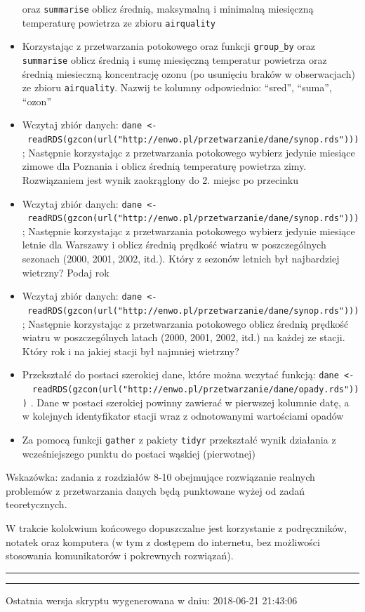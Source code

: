 \documentclass[]{book}
\theoremstyle{definition}
\theoremstyle{definition}
\theoremstyle{definition}
\theoremstyle{remark}
\begin{document}
\begin{itemize}
  oraz \texttt{summarise} oblicz średnią, maksymalną i minimalną
  miesięczną temperaturę powietrza ze zbioru \texttt{airquality}
\item
  Korzystając z przetwarzania potokowego oraz funkcji \texttt{group\_by}
  oraz \texttt{summarise} oblicz średnią i sumę miesięczną temperatur
  powietrza oraz średnią miesieczną koncentrację ozonu (po usunięciu
  braków w obserwacjach) ze zbioru \texttt{airquality}. Nazwij te
  kolumny odpowiednio: ``sred'', ``suma'', ``ozon''
\item
  Wczytaj zbiór danych:
  \texttt{dane\ \textless{}-\ readRDS(gzcon(url("http://enwo.pl/przetwarzanie/dane/synop.rds")))}
  ; Następnie korzystając z przetwarzania potokowego wybierz jedynie
  miesiące zimowe dla Poznania i oblicz średnią temperaturę powietrza
  zimy. Rozwiązaniem jest wynik zaokrąglony do 2. miejsc po przecinku
\item
  Wczytaj zbiór danych:
  \texttt{dane\ \textless{}-\ readRDS(gzcon(url("http://enwo.pl/przetwarzanie/dane/synop.rds")))}
  ; Następnie korzystając z przetwarzania potokowego wybierz jedynie
  miesiące letnie dla Warszawy i oblicz średnią prędkość wiatru w
  poszczególnych sezonach (2000, 2001, 2002, itd.). Który z sezonów
  letnich był najbardziej wietrzny? Podaj rok
\item
  Wczytaj zbiór danych:
  \texttt{dane\ \textless{}-\ readRDS(gzcon(url("http://enwo.pl/przetwarzanie/dane/synop.rds")))}
  ; Następnie korzystając z przetwarzania potokowego oblicz średnią
  prędkość wiatru w poszczególnych latach (2000, 2001, 2002, itd.) na
  każdej ze stacji. Który rok i na jakiej stacji był najmniej wietrzny?
\item
  Przekształć do postaci szerokiej dane, które można wczytać funkcją:
  \texttt{dane\ \textless{}-\ \ readRDS(gzcon(url("http://enwo.pl/przetwarzanie/dane/opady.rds")))}
  . Dane w postaci szerokiej powinny zawierać w pierwszej kolumnie datę,
  a w kolejnych identyfikator stacji wraz z odnotowanymi wartościami
  opadów
\item
  Za pomocą funkcji \texttt{gather} z pakiety \texttt{tidyr} przekształć
  wynik działania z wcześniejszego punktu do postaci wąskiej
  (pierwotnej)
\end{itemize}

Wskazówka: zadania z rozdziałów 8-10 obejmujące rozwiązanie realnych
problemów z przetwarzania danych będą punktowane wyżej od zadań
teoretycznych.

W trakcie kolokwium końcowego dopuszczalne jest korzystanie z
podręczników, notatek oraz komputera (w tym z dostępem do internetu, bez
możliwości stosowania komunikatorów i pokrewnych rozwiązań).

\begin{center}\rule{0.5\linewidth}{\linethickness}\end{center}

\begin{center}\rule{0.5\linewidth}{\linethickness}\end{center}

Ostatnia wersja skryptu wygenerowana w dniu: 2018-06-21 21:43:06


\end{document}
